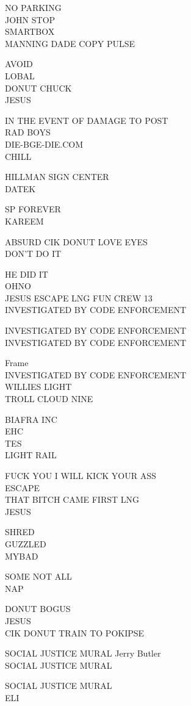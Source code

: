 \documentclass[10pt,letterpaper]{article}
\begin{document}
NO PARKING\\
JOHN STOP\\
SMARTBOX\\
MANNING DADE COPY PULSE

AVOID\\
LOBAL\\
DONUT CHUCK\\
JESUS

IN THE EVENT OF DAMAGE TO POST\\
RAD BOYS\\
DIE{-}BGE{-}DIE.COM\\
CHILL

HILLMAN SIGN CENTER\\
DATEK

SP FOREVER\\
KAREEM

ABSURD CIK DONUT LOVE EYES\\
DON'T DO IT

HE DID IT\\
OHNO\\
JESUS ESCAPE LNG FUN CREW 13\\
INVESTIGATED BY CODE ENFORCEMENT

INVESTIGATED BY CODE ENFORCEMENT\\
INVESTIGATED BY CODE ENFORCEMENT

Frame\\
INVESTIGATED BY CODE ENFORCEMENT\\
WILLIES LIGHT\\
TROLL CLOUD NINE

BIAFRA INC\\
EHC\\
TES\\
LIGHT RAIL

FUCK YOU I WILL KICK YOUR ASS\\
ESCAPE\\
THAT BITCH CAME FIRST LNG\\
JESUS

SHRED\\
GUZZLED\\
MYBAD

SOME NOT ALL\\
NAP

DONUT BOGUS\\
JESUS\\
CIK DONUT TRAIN TO POKIPSE

SOCIAL JUSTICE MURAL Jerry Butler\\
SOCIAL JUSTICE MURAL

SOCIAL JUSTICE MURAL\\
ELI
\end{document}
